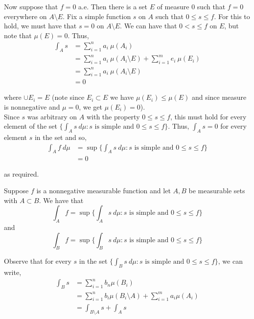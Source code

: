 \documentclass[12pt]{article}
\newenvironment{problem}[2][Problem]{\begin{trivlist}
\item[\hskip \labelsep {\bfseries #1}\hskip \labelsep {\bfseries #2.}]}{\end{trivlist}}
\begin{document}
Now suppose that $f = 0$ a.e. Then there is a set $E$ of measure 0 such that $f = 0$ everywhere on $A \setminus E$. Fix a simple function $s$ on $A$ such that $0 \leq s \leq f$. For this to hold, we must have that $s = 0$ on $A \setminus E$. We can have that $0 < s \leq f$ on $E$, but note that $\mu(E) = 0$. Thus,
\begin{align*}
\int_A s &= \sum_{i=1}^n a_i \ \mu(A_i)\\
&= \sum_{i=1}^n a_i \ \mu(A_i \setminus E) + \sum_{i=1}^m e_i \ \mu(E_i)\\
&= \sum_{i=1}^n a_i \ \mu(A_i \setminus E)\\
&= 0
\end{align*}

where $\cup E_i = E$ (note since $E_i \subset E$ we have $\mu(E_i) \leq \mu(E)$ and since measure is nonnegative and $\mu = 0$, we get $\mu(E_i) = 0$).\\

Since $s$ was arbitrary on $A$ with the property $0 \leq s \leq f$, this must hold for every element of the set $\{ \int_A s \ d\mu: s \text{ is simple and } 0 \leq s \leq f\}$. Thus, $\int_A s = 0$ for every element $s$ in the set and so,
\begin{align*}
\int_A f \ d\mu &= \sup \{ \int_A s \ d\mu: s \text{ is simple and } 0 \leq s \leq f\}\\
&= 0
\end{align*}

as required.

\begin{problem}{3}
\end{problem}

Suppose $f$ is a nonnegative measurable function and let $A, B$ be measurable sets with $A \subset B$. We have that $$\int_A f = \sup \{ \int_A s \ d\mu: s \text{ is simple and } 0 \leq s \leq f\}$$ and $$\int_B f = \sup \{ \int_B s \ d\mu: s \text{ is simple and } 0 \leq s \leq f\}$$

Observe that for every $s$ in the set $\{ \int_B s \ d\mu: s \text{ is simple and } 0 \leq s \leq f\}$, we can write,
\begin{align*}
\int_B s &= \sum_{i=1}^n b_n \mu(B_i)\\
&= \sum_{i=1}^n b_i \mu(B_i \setminus A) + \sum_{i=1}^m a_i \mu(A_i)\\
&= \int_{B \setminus A} s + \int_{A} s
\end{align*}
\end{document}
